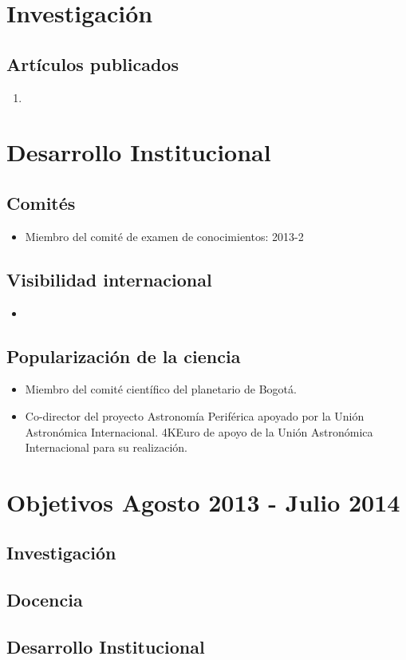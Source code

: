 \documentclass{article}
\begin{document}
\section*{Investigaci\'on}

\subsection*{Art\'iculos publicados}

\begin{enumerate}
\item 
\end{enumerate}

\section*{Desarrollo Institucional}

\subsection*{Comit\'es}

\begin{itemize}
\item {Miembro del comit\'e de examen de conocimientos}: 2013-2
\end{itemize}

\subsection*{Visibilidad internacional}

\begin{itemize}
\item 
\end{itemize}

\subsection*{Popularizaci\'on de la ciencia}
\begin{itemize}
\item {Miembro del comit\'e cient\'ifico del planetario de Bogot\'a.}
\item {Co-director del proyecto Astronom\'ia Perif\'erica apoyado por
  la Uni\'on Astron\'omica Internacional. 4KEuro de apoyo de la Uni\'on Astron\'omica Internacional para su realizaci\'on.}
\end{itemize}


\section*{Objetivos Agosto 2013 - Julio 2014}
\subsection*{Investigaci\'on}

\subsection*{Docencia}

\subsection*{Desarrollo Institucional}
\end{document}
